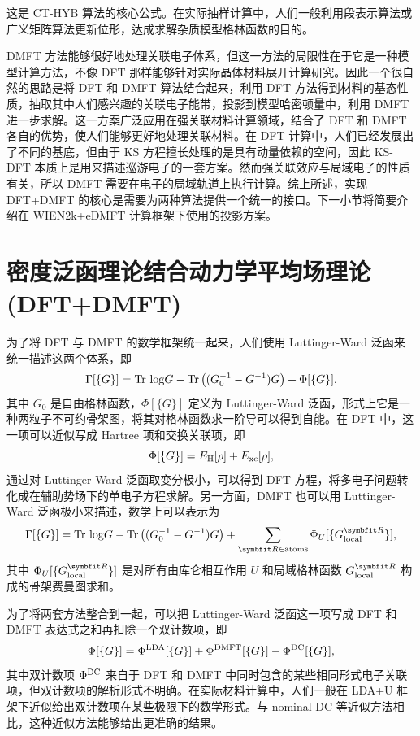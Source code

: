 这是 CT-HYB 算法的核心公式。在实际抽样计算中，人们一般利用段表示算法\cite{PhysRevLett.97.076405}或广义矩阵算法\cite{PhysRevB.74.155107, PhysRevB.75.155113}更新位形，达成求解杂质模型格林函数的目的。

DMFT 方法能够很好地处理关联电子体系，但这一方法的局限性在于它是一种模型计算方法，不像 DFT 那样能够针对实际晶体材料展开计算研究。因此一个很自然的思路是将 DFT 和 DMFT 算法结合起来，利用 DFT 方法得到材料的基态性质，抽取其中人们感兴趣的关联电子能带，投影到模型哈密顿量中，利用 DMFT 进一步求解\cite{RevModPhys.78.865}。这一方案广泛应用在强关联材料计算领域，结合了 DFT 和 DMFT 各自的优势，使人们能够更好地处理关联材料。在 DFT 计算中，人们已经发展出了不同的基底，但由于 KS 方程擅长处理的是具有动量依赖的空间，因此 KS-DFT 本质上是用来描述巡游电子的一套方案。然而强关联效应与局域电子的性质有关，所以 DMFT 需要在电子的局域轨道上执行计算。综上所述，实现 DFT+DMFT 的核心是需要为两种算法提供一个统一的接口。下一小节将简要介绍在 WIEN2k+eDMFT 计算框架下使用的投影方案。
\section{密度泛函理论结合动力学平均场理论(DFT+DMFT)}
为了将 DFT 与 DMFT 的数学框架统一起来，人们使用 Luttinger-Ward 泛函来统一描述这两个体系\cite{PhysRev.118.1417}，即 
\begin{equation}
    \Gamma[\{ G \}] =\mathrm{Tr}\ \mathrm{log} G-\mathrm{Tr}\left( (G_0^{-1}-G^{-1} ) G\right) +\Phi[\{ G \}],
\end{equation}
其中 $G_0$ 是自由格林函数，$\Phi[\{G\}]$ 定义为 Luttinger-Ward 泛函，形式上它是一种两粒子不可约骨架图，将其对格林函数求一阶导可以得到自能。在 DFT 中，这一项可以近似写成 Hartree 项和交换关联项，即 
\begin{equation}
    \Phi[\{ G \}]=E_{\mathrm{H}}[\rho]+E_{\mathrm{xc}}[\rho],
\end{equation}
通过对 Luttinger-Ward 泛函取变分极小，可以得到 DFT 方程，将多电子问题转化成在辅助势场下的单电子方程求解。另一方面，DMFT 也可以用 Luttinger-Ward 泛函极小来描述，数学上可以表示为 
\begin{equation}
    \Gamma[\{ G \}] = \fun{Tr}\ \fun{log} G-\fun{Tr}\ls (G_0^{-1}-G^{-1})G \rs+\sum_{\vct{R}\in\fun{atoms}}\Phi_U[\{G_{\fun{local}}^{\vct{R}}\}],
\end{equation}
其中 $\Phi_U[\{ G_{\fun{local}}^{\vct{R}} \}]$ 是对所有由库仑相互作用 $U$ 和局域格林函数 $G_{\fun{local}}^{\vct{R}}$ 构成的骨架费曼图求和。

为了将两套方法整合到一起，可以把 Luttinger-Ward 泛函这一项写成 DFT 和 DMFT 表达式之和再扣除一个双计数项，即
\begin{equation}
    \Phi[\{ G \}]=\Phi^{\mathrm{LDA}}[\{ G \}]+\Phi^{\mathrm{DMFT}}[\{ G \}]-\Phi^{\mathrm{DC}}[\{G\}],
\end{equation}
其中双计数项 $\Phi^{\mathrm{DC} }$ 来自于 DFT 和 DMFT 中同时包含的某些相同形式电子关联项，但双计数项的解析形式不明确。在实际材料计算中，人们一般在 LDA+U 框架下近似给出双计数项在某些极限下的数学形式\cite{PhysRevB.81.195107}。与 nominal-DC 等近似方法相比，这种近似方法能够给出更准确的结果。

